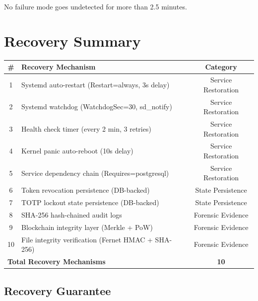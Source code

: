 \documentclass[11pt,a4paper]{article}
\begin{document}
No failure mode goes undetected for more than 2.5 minutes.

\section{Recovery Summary}

\begin{center}
\begin{tabular}{clc}
\toprule
\textbf{\#} & \textbf{Recovery Mechanism} & \textbf{Category} \\
\midrule
1 & Systemd auto-restart (Restart=always, 3s delay) & Service Restoration \\
2 & Systemd watchdog (WatchdogSec=30, sd\_notify) & Service Restoration \\
3 & Health check timer (every 2 min, 3 retries) & Service Restoration \\
4 & Kernel panic auto-reboot (10s delay) & Service Restoration \\
5 & Service dependency chain (Requires=postgresql) & Service Restoration \\
6 & Token revocation persistence (DB-backed) & State Persistence \\
7 & TOTP lockout state persistence (DB-backed) & State Persistence \\
8 & SHA-256 hash-chained audit logs & Forensic Evidence \\
9 & Blockchain integrity layer (Merkle + PoW) & Forensic Evidence \\
10 & File integrity verification (Fernet HMAC + SHA-256) & Forensic Evidence \\
\midrule
\multicolumn{2}{l}{\textbf{Total Recovery Mechanisms}} & \textbf{10} \\
\bottomrule
\end{tabular}
\end{center}

\vspace{1em}

\subsection{Recovery Guarantee}
\end{document}
